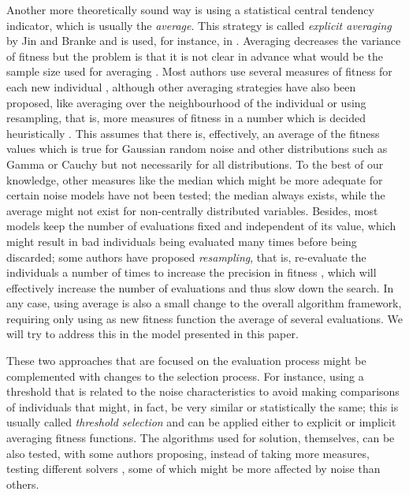 \documentclass{llncs}
\begin{document}
Another more theoretically sound way is using a statistical central tendency
indicator, which is usually the {\em average}. This strategy is called
{\em explicit averaging} by Jin and Branke and is used, for instance,
in 
\cite{Junhua20136780}. Averaging decreases the variance of fitness but
the problem is that it is not clear in advance what would be the
sample size used for averaging \cite{aizawa1994scheduling}. Most
authors use several measures of fitness for each new individual
\cite{costa2013using}, although other averaging strategies have also
been proposed, like averaging over the neighbourhood of the
individual or using resampling, that is, more measures of fitness in a
number which is decided heuristically \cite{liu2014mathematically}. This assumes that there is, effectively, an average of the
fitness values which is true for Gaussian random noise and other
distributions such as Gamma or Cauchy but not
necessarily for all distributions. 
To the best of our knowledge, 
other measures like the median which might be more adequate for
certain noise models have not been tested; the median always exists,
while the average might not exist for non-centrally distributed
variables. Besides, most models keep the number of evaluations fixed 
and independent of its value, 
which might result in bad individuals
being evaluated many times before being discarded; some authors have
proposed {\em resampling}, that is, re-evaluate the individuals a number of times to increase the precision in fitness
\cite{RadaVilela2014}, 
which will effectively increase the number of
evaluations and thus slow down the search. In any case, using average is
also a small change to the overall algorithm framework, requiring only
using as new fitness function the average of several evaluations.
We will try to address this in the model presented in this
paper. 

These two approaches that are focused on the evaluation process might
be complemented with changes to the selection process. For instance,
using a threshold \cite{Rudolph2001318} that is related to the noise characteristics to
avoid making comparisons of individuals that might, in fact, be very
similar or statistically the same; this is usually called {\em
  threshold selection} and can be applied either to explicit or
implicit averaging fitness functions. The algorithms used for
solution, themselves, can be also tested, with some authors proposing, instead of taking more measures, 
testing different solvers \cite{cauwet2014algorithm}, some of which
might be more affected by noise than others. 
\end{document}
